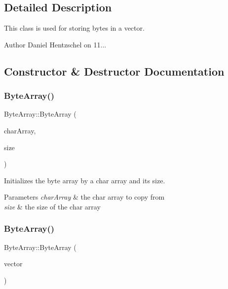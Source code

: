 \subsection{Detailed Description}
This class is used for storing bytes in a vector. 

\begin{DoxyAuthor}{Author}
Daniel Hentzschel on 11... 
\end{DoxyAuthor}


\subsection{Constructor \& Destructor Documentation}
\mbox{\label{class_byte_array_a5370ae20f7491913d891a624ea77ad52}} 
\subsubsection{\texorpdfstring{ByteArray()}{ByteArray()}\hspace{0.1cm}{\footnotesize\ttfamily [1/2]}}
{\footnotesize\ttfamily Byte\+Array\+::\+Byte\+Array (\begin{DoxyParamCaption}\item[{const char $\ast$}]{char\+Array,  }\item[{size\+\_\+t}]{size }\end{DoxyParamCaption})}



Initializes the byte array by a char array and its size. 


\begin{DoxyParams}{Parameters}
{\em char\+Array} & the char array to copy from \\
\hline
{\em size} & the size of the char array \\
\hline
\end{DoxyParams}
\mbox{\label{class_byte_array_a94a65f2b5c6952713712e23a574b0295}} 
\subsubsection{\texorpdfstring{ByteArray()}{ByteArray()}\hspace{0.1cm}{\footnotesize\ttfamily [2/2]}}
{\footnotesize\ttfamily Byte\+Array\+::\+Byte\+Array (\begin{DoxyParamCaption}\item[{const \mbox{\hyperlink{class_a_vector}{A\+Vector}}$<$ char $>$ \&}]{vector }\end{DoxyParamCaption})}



